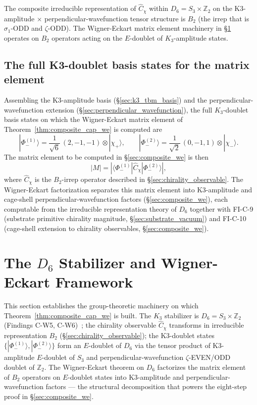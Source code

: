 \documentclass[11pt,letterpaper]{article}
\newcommand{\Kthree}{\ensuremath{K_3}}
\newcommand{\Cchi}{\hat{C}_\chi}
\newcommand{\PhiminusOne}{|\Phi_-^{(1)}\rangle}
\newcommand{\PhiminusTwo}{|\Phi_-^{(2)}\rangle}
\newcommand{\chiplus}{|\chi_+\rangle}
\newcommand{\chiminus}{|\chi_-\rangle}
\newcommand{\Dsix}{D_6}
\newcommand{\Sthree}{S_3}
\begin{document}
The composite irreducible representation of $\Cchi$ within $\Dsix = \Sthree \times \mathbb{Z}_2$ on the K3-amplitude $\times$ perpendicular-wavefunction tensor structure is $B_2$ (the irrep that is $\sigma_1$-ODD and $\zeta$-ODD). The Wigner-Eckart matrix element machinery in \S\ref{sec:d6_we} operates on $B_2$ operators acting on the $E$-doublet of $\Kthree$-amplitude states.

\subsection{The full K3-doublet basis states for the matrix element}\label{sec:full_basis}

Assembling the K3-amplitude basis (\S\ref{sec:k3_tbm_basis}) and the perpendicular-wavefunction extension (\S\ref{sec:perpendicular_wavefunction}), the full $\Kthree$-doublet basis states on which the Wigner-Eckart matrix element of Theorem~\ref{thm:composite_cap_we} is computed are
\begin{equation}\label{eq:full_basis}
\PhiminusOne = \frac{1}{\sqrt{6}}\,(2, -1, -1) \otimes \chiplus, \qquad
\PhiminusTwo = \frac{1}{\sqrt{2}}\,(0, -1, 1) \otimes \chiminus.
\end{equation}
The matrix element to be computed in \S\ref{sec:composite_we} is then
\[
|M| = |\langle \Phi_-^{(1)} | \Cchi | \Phi_-^{(2)} \rangle|,
\]
where $\Cchi$ is the $B_2$-irrep operator described in \S\ref{sec:chirality_observable}. The Wigner-Eckart factorization separates this matrix element into K3-amplitude and cage-shell perpendicular-wavefunction factors (\S\ref{sec:composite_we}), each computable from the irreducible representation theory of $\Dsix$ together with FI-C-9 (substrate primitive chirality magnitude, \S\ref{sec:substrate_vacuum}) and FI-C-10 (cage-shell extension to chirality observables, \S\ref{sec:composite_we}).

\section{The $\Dsix$ Stabilizer and Wigner-Eckart Framework}\label{sec:d6_we}

This section establishes the group-theoretic machinery on which Theorem~\ref{thm:composite_cap_we} is built. The $\Kthree$ stabilizer is $\Dsix = \Sthree \times \mathbb{Z}_2$ (Findings C-W5, C-W6)~\cite{abshier_capotauro_subclaim_c_sketch}; the chirality observable $\Cchi$ transforms in irreducible representation $B_2$ (\S\ref{sec:chirality_observable}); the K3-doublet states $\{\PhiminusOne, \PhiminusTwo\}$ form an $E$-doublet of $\Dsix$ via the tensor product of K3-amplitude $E$-doublet of $\Sthree$ and perpendicular-wavefunction $\zeta$-EVEN/ODD doublet of $\mathbb{Z}_2$. The Wigner-Eckart theorem on $\Dsix$ factorizes the matrix element of $B_2$ operators on $E$-doublet states into K3-amplitude and perpendicular-wavefunction factors --- the structural decomposition that powers the eight-step proof in \S\ref{sec:composite_we}.
\end{document}
